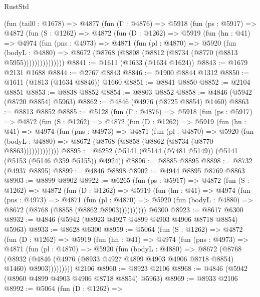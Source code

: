 \begin{lexlean}{RustStd}
\begin{coremodule}
    (fun (tail0 : @1678) =>
    @4877
      (fun (Γ : @4876) =>
      @5918
        (fun (ps : @5917) =>
        @4872
          (fun (S : @1262) =>
          @4872
            (fun (D : @1262) =>
            @5919
              (fun (hn : @41) =>
              @4974
                (fun (pns : @4973) =>
                @4871
                  (fun (pl : @4870) =>
                  @5920
                    (fun (bodyL : @4880) =>
                    @8672 (@8768 (@8808 (@8812 (@8734 (@8770 (@8813 @5955)))))))))))))))
@8841 := @1611 (@1633 (@1634 @1624))
@8843 := @1679 @2131 @1688
@8844 := @2767 @8843
@8846 := @1900 @8844 @1312
@8850 := @1611 (@1813 (@1634 @8846)) @1660
@8851 := @8841 @8850
@8852 := @2104 @8851
@8853 := @8838 @8852
@8854 := @8803 @8852
@8858 := @4846 (@5942 (@8720 @8854) @5963)
@8862 := @4846 (@4976 (@8725 @8854) @1460)
@8863 := @8813 @8852
@8885 := @5128
    (fun (Γ : @4876) =>
    @5918
      (fun (ps : @5917) =>
      @4872
        (fun (S : @1262) =>
        @4872
          (fun (D : @1262) =>
          @5919
            (fun (hn : @41) =>
            @4974
              (fun (pns : @4973) =>
              @4871
                (fun (pl : @4870) =>
                @5920
                  (fun (bodyL : @4880) =>
                  @8672 (@8768 (@8858 (@8862 (@8734 (@8770 @8863)))))))))))))
@8895 := @6252 (@5141 (@5144 (@7481 @5149)) (@5141 (@5153 (@5146 @359 @5155)) @4924))
@8896 := @8885 @8895
@8898 := @8732 (@4937 @8895)
@8899 := @4846 @8898
@8902 := @4944 @8895 @8769 @8863
@8903 := @8899 @8902
@8922 := @6265
    (fun (ps : @5917) =>
    @4872
      (fun (S : @1262) =>
      @4872
        (fun (D : @1262) =>
        @5919
          (fun (hn : @41) =>
          @4974
            (fun (pns : @4973) =>
            @4871
              (fun (pl : @4870) =>
              @5920 (fun (bodyL : @4880) => @8672 (@8768 (@8858 (@8862 @8903))))))))))
    @6300
@8923 := @8617 @6300
@8932 := @4846 (@5942 (@8923 @4927 @4899 @4903 @4906 @8718 @8854) @5963)
@8933 := @8628 @6300
@8959 := @5064
    (fun (S : @1262) =>
    @4872
      (fun (D : @1262) =>
      @5919
        (fun (hn : @41) =>
        @4974
          (fun (pns : @4973) =>
          @4871
            (fun (pl : @4870) =>
            @5920
              (fun (bodyL : @4880) =>
              @8672
                (@8768
                  (@8932
                    (@4846 (@4976 (@8933 @4927 @4899 @4903 @4906 @8718 @8854) @1460) @8903)))))))))
    @2106
@8960 := @8923 @2106
@8968 := @4846 (@5942 (@8960 @4899 @4903 @4906 @8718 @8854) @5963)
@8969 := @8933 @2106
@8992 := @5064
    (fun (D : @1262) =>

\end{coremodule}
\end{lexlean}

